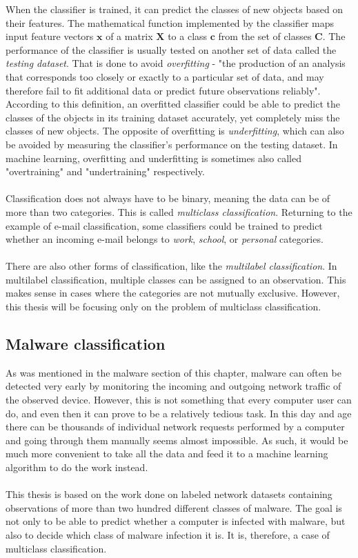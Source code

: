 \documentclass[11pt]{article}
\begin{document}
      When the classifier is trained, it can predict the classes of new objects based on their features. The mathematical function implemented by the classifier maps input feature vectors $\mathbf{x}$ of a matrix $\mathbf{X}$ to a class $\mathbf{c}$ from the set of classes $\mathbf{C}$. The performance of the classifier is usually tested on another set of data called the {\it testing dataset}. That is done to avoid {\it overfitting} - "the production of an analysis that corresponds too closely or exactly to a particular set of data, and may therefore fail to fit additional data or predict future observations reliably".\cite{oxford} According to this definition, an overfitted classifier could be able to predict the classes of the objects in its training dataset accurately, yet completely miss the classes of new objects. The opposite of overfitting is {\it underfitting}, which can also be avoided by measuring the classifier's performance on the testing dataset. In machine learning, overfitting and underfitting is sometimes also called "overtraining" and "undertraining" respectively.
      \\~\\
      Classification does not always have to be binary, meaning the data can be of more than two categories. This is called {\it multiclass classification}. Returning to the example of e-mail classification, some classifiers could be trained to predict whether an incoming e-mail belongs to {\it work}, {\it school}, or {\it personal} categories.
      \\~\\
      There are also other forms of classification, like the {\it multilabel classification}. In multilabel classification, multiple classes can be assigned to an observation. This makes sense in cases where the categories are not mutually exclusive. However, this thesis will be focusing only on the problem of multiclass classification.
    \subsection{Malware classification}
      As was mentioned in the malware section of this chapter, malware can often be detected very early by monitoring the incoming and outgoing network traffic of the observed device. However, this is not something that every computer user can do, and even then it can prove to be a relatively tedious task. In this day and age there can be thousands of individual network requests performed by a computer and going through them manually seems almost impossible. As such, it would be much more convenient to take all the data and feed it to a machine learning algorithm to do the work instead.
      \\~\\
      This thesis is based on the work done on labeled network datasets containing observations of more than two hundred different classes of malware. The goal is not only to be able to predict whether a computer is infected with malware, but also to decide which class of malware infection it is. It is, therefore, a case of multiclass classification.
      
\end{document}
